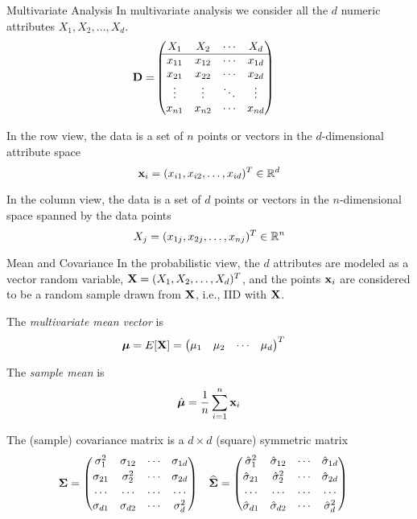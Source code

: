 \begin{frame}{Multivariate Analysis}
In multivariate analysis we consider all the
$d$ numeric attributes $X_1, X_2,
\ldots, X_d$.
\begin{align*}
    \bD = &
    \matr{%
        X_1 & X_2 & \cdots & X_d\\
        \hline
        x_{11} & x_{12} & \cdots & x_{1d}\\
        x_{21} & x_{22} & \cdots & x_{2d}\\
        \vdots & \vdots & \ddots & \vdots\\
        x_{n1} & x_{n2} & \cdots & x_{nd}
        }
\end{align*}

In the row view, the data is a set of
$n$ points or vectors in the \hbox{$d$-dimensional} attribute space
$${\mathbf{x}_i} = (x_{i1}, x_{i2}, \ldots, x_{id})^T \in {\mathord{\mathbb R}}^d$$

In the column view, the data is a set of
$d$ points or vectors in the $n$-dimensional space spanned by the
data points
$$X_{j} = (x_{1j}, x_{2j}, \ldots, x_{nj})^T \in {\mathord{\mathbb R}}^n$$

\end{frame}


\begin{frame}{Mean and Covariance}
In the probabilistic view, the $d$ attributes are modeled as a
vector random variable, $\mathbf{X} = (X_1, X_2,\ldots, X_d)^T$, and
the points $\mathbf{x}_i$ are considered to be a random sample drawn
from $\mathbf{X}$, i.e., IID with $\mathbf{X}$.

The {\em multivariate mean vector}
is 
\begin{align*}
    {\bm \mu} & = E[\mathbf{X}] =
  \begin{pmatrix} \mu_{1} & \mu_{2} & \cdots & \mu_{d} \end{pmatrix}^T
\end{align*}

The {\em sample mean} is
\begin{align*}
    \hat{{\bm \mu}} = {1 \over n} \sum_{i=1}^n \mathbf{x}_i
\end{align*}


The (sample) covariance matrix is a $d\times d$ (square) symmetric matrix
\begin{align*}
  {\bm \Sigma} &  =
  \begin{pmatrix} 
      \sigma^2_{1} & \sigma_{12} & \cdots & \sigma_{1d}\\[0.2em]
      \sigma_{21} & \sigma^2_{2} & \cdots & \sigma_{2d}\\[0.2em]
      \cdots & \cdots & \cdots & \cdots\\
      \sigma_{d1} & \sigma_{d2} & \cdots & \sigma^2_{d}\\
   \end{pmatrix}
  &
  \widehat{{\bm \Sigma}} & =
  \begin{pmatrix} 
      \hat{\sigma}^2_{1} & \hat{\sigma}_{12} & \cdots & \hat{\sigma}_{1d}\\[0.2em]
      \hat{\sigma}_{21} & \hat{\sigma}^2_{2} & \cdots & \hat{\sigma}_{2d}\\[0.2em]
      \cdots & \cdots & \cdots & \cdots\\
      \hat{\sigma}_{d1} & \hat{\sigma}_{d2} & \cdots & \hat{\sigma}^2_{d}\\
   \end{pmatrix}
\end{align*}
\end{frame}


